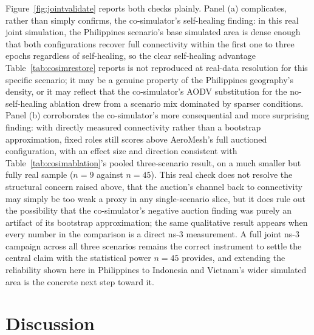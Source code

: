 \documentclass[drones,article,submit,moreauthors]{Definitions/mdpi}
\begin{document}
Figure~\ref{fig:jointvalidate} reports both checks plainly. Panel (a) complicates, rather than simply confirms, the co-simulator's self-healing finding: in this real joint simulation, the Philippines scenario's base simulated area is dense enough that both configurations recover full connectivity within the first one to three epochs regardless of self-healing, so the clear self-healing advantage Table~\ref{tab:cosimrestore} reports is not reproduced at real-data resolution for this specific scenario; it may be a genuine property of the Philippines geography's density, or it may reflect that the co-simulator's AODV substitution for the no-self-healing ablation drew from a scenario mix dominated by sparser conditions. Panel (b) corroborates the co-simulator's more consequential and more surprising finding: with directly measured connectivity rather than a bootstrap approximation, fixed roles still scores above AeroMesh's full auctioned configuration, with an effect size and direction consistent with Table~\ref{tab:cosimablation}'s pooled three-scenario result, on a much smaller but fully real sample ($n=9$ against $n=45$). This real check does not resolve the structural concern raised above, that the auction's channel back to connectivity may simply be too weak a proxy in any single-scenario slice, but it does rule out the possibility that the co-simulator's negative auction finding was purely an artifact of its bootstrap approximation; the same qualitative result appears when every number in the comparison is a direct ns-3 measurement. A full joint ns-3 campaign across all three scenarios remains the correct instrument to settle the central claim with the statistical power $n=45$ provides, and extending the reliability shown here in Philippines to Indonesia and Vietnam's wider simulated area is the concrete next step toward it.
\label{sec:results-pending}

\section{Discussion}
\label{sec:discussion}
\end{document}
